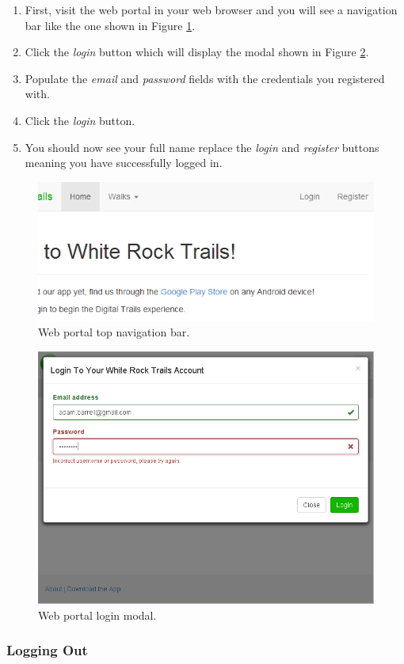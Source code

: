 \documentclass[11pt,a4paper]{report}
\begin{document}
\begin{enumerate}
\item First, visit the web portal in your web browser and you will see a navigation bar like the one shown in Figure \ref{fig:login-guide}.
\item Click the \emph{login} button which will display the modal shown in Figure \ref{fig:login-modal}.
\item Populate the \emph{email} and \emph{password} fields with the credentials you registered with.
\item Click the \emph{login} button.
\item You should now see your full name replace the \emph{login} and \emph{register} buttons meaning you have successfully logged in.
\end{enumerate}

\begin{figure}[H]
\centering
\includegraphics[width=0.7\linewidth]{./img/webportal-guide/login}
\caption{Web portal top navigation bar.}
\label{fig:login-guide}
\end{figure}

\begin{figure}[H]
\centering
\includegraphics[width=0.6\linewidth]{./img/webportal/login}
\caption{Web portal login modal.}
\label{fig:login-modal}
\end{figure}

\subsubsection{Logging Out}
\end{document}
